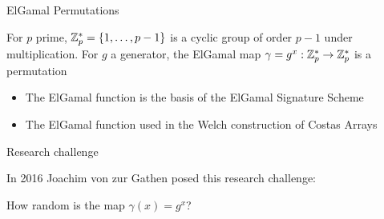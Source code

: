 
\begin{frame}{ElGamal Permutations}

For $p$ prime, $\mathbb{Z}_p^* = \{1, \ldots, p-1\}$ is a cyclic group of order $p-1$ under multiplication. For $g$ a generator, the ElGamal map $\gamma = g^x: \mathbb{Z}_p^* \rightarrow \mathbb{Z}_p^*$ is a permutation
\vspace{1cm}

\begin{itemize}
\item The ElGamal function is the basis of the ElGamal Signature Scheme
  \item The ElGamal function used in the Welch construction of Costas Arrays
  \end{itemize}

  
\end{frame}




\begin{frame}{Research challenge}
  
In 2016 Joachim von zur Gathen posed this research challenge:

\begin{center}
  {\Large
How random is the map $\gamma(x) = g^x$?}
\end{center}


\end{frame}




